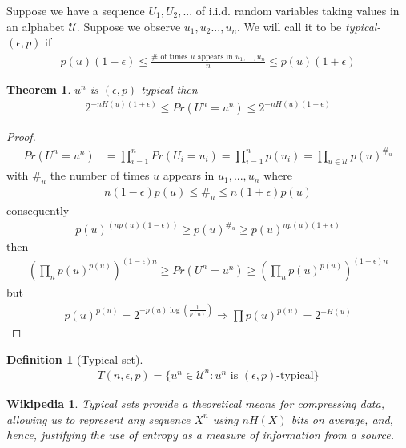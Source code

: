 \documentclass{article}
\newtheorem{theorem}{Theorem}[section]
\newtheorem*{wikipedia}{Wikipedia}
\newtheorem{definition}{Definition}[section]
\theoremstyle{definition} %
\def\U{\mathcal{U}}
\begin{document}
Suppose we have a sequence $U_1, U_2, ...$ of i.i.d. random variables taking values in an alphabet $\U$.
Suppose we observe $u_1,u_2..., u_n$. We will call it to be \textit{typical-$(\epsilon, p)$} if
\begin{align*}
  p(u) (1 - \epsilon)
  \leq \frac{\# \text{ of times $u$ appears in $u_1, ..., u_n$}}{n}
  \leq p(u)(1+\epsilon)
\end{align*}

\begin{theorem}
  $u^n$ is $(\epsilon, p)$-typical then
  \begin{align*}
    2^{-n H(u)(1 + \epsilon)}
    \leq Pr(U^n = u^n)
    \leq 2^{-n H(u)(1 + \epsilon)}
  \end{align*}
\end{theorem}

\begin{proof}
  \begin{align*}
    Pr(U^n = u^n) &= \prod_{i=1}^n Pr(U_i = u_i) = \prod_{i=1}^n p(u_i) = \prod_{u \in \U} p(u)^{\#_u}
  \end{align*}
  with $\#_u$ the number of times $u$ appears in $u_1, ..., u_n$ where
  \begin{align*}
    n (1-\epsilon) p(u) \leq \#_u \leq n(1+\epsilon)p(u)
  \end{align*}
  consequently
  \begin{align*}
    p(u)^{(n p(u)(1-\epsilon))} \geq p(u)^{\#_u} \geq p(u)^{n p(u)(1+\epsilon)}
  \end{align*}
  then
  \begin{align*}
    (\prod_{n} p(u)^{p(u)})^{(1-\epsilon)n}
    \geq Pr(U^n = u^n)
    \geq (\prod_{n} p(u)^{p(u)})^{(1+\epsilon)n}
  \end{align*}
  but
  \begin{align*}
    p(u)^{p(u)} = 2^{-p(u) \log(\frac{1}{p(u)})} \Rightarrow \prod p(u)^{p(u)} = 2^{-H(u)}
  \end{align*}
\end{proof}

\begin{definition}[Typical set]
  \begin{align*}
    T(n, \epsilon, p) = \{ u^n \in \U^n : u^n \text{ is } (\epsilon, p)\text{-typical}\}
  \end{align*}
\end{definition}

\begin{wikipedia}
  Typical sets provide a theoretical means for compressing data, allowing us to represent any sequence $X^n$ using $nH(X)$ bits on average, and, hence, justifying the use of entropy as a measure of information from a source.
\end{wikipedia}
\end{document}

